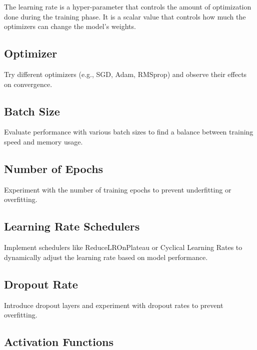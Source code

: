 \documentclass[10pt,twocolumn,letterpaper]{article}
\begin{document}
The learning rate is a hyper-parameter that controls the amount of optimization done during the training phase.
It is a scalar value that controls how much the optimizers can change the model's weights.


\subsection{Optimizer}

Try different optimizers (e.g., SGD, Adam, RMSprop) and observe their effects on convergence.

\subsection{Batch Size}

Evaluate performance with various batch sizes to find a balance between training speed and memory usage.

\subsection{Number of Epochs}

Experiment with the number of training epochs to prevent underfitting or overfitting.

\subsection{Learning Rate Schedulers}

Implement schedulers like ReduceLROnPlateau or Cyclical Learning Rates to dynamically adjust the learning rate based on model performance.

\subsection{Dropout Rate}

Introduce dropout layers and experiment with dropout rates to prevent overfitting.

\subsection{Activation Functions}
\end{document}
